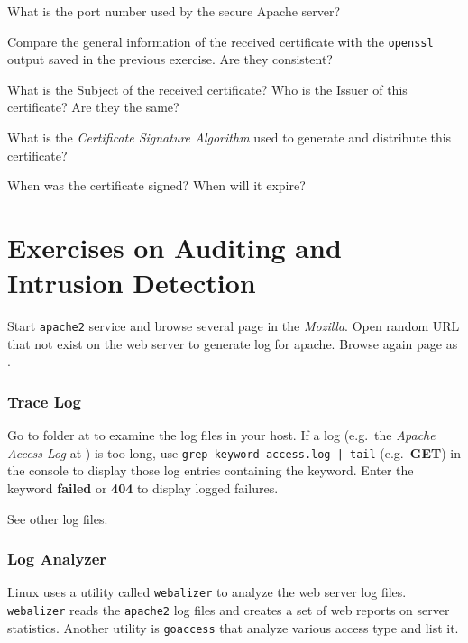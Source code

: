 \documentclass{../UTNetLab}
\begin{document}
    \begin{report}
        \item What is the port number used by the secure Apache server?
        
        \item Compare the general information of the received certificate with the \lstinline{openssl} output saved in the previous exercise.
            Are they consistent?
        
        \item What is the Subject of the received certificate? Who is the Issuer of this certificate? Are they the same?
        
        \item What is the \textit{Certificate Signature Algorithm} used to generate and distribute this certificate?
        
        \item When was the certificate signed? When will it expire?
    \end{report}

\part{Exercises on Auditing and Intrusion Detection}
    Start \lstinline{apache2} service and browse several page in the \textit{Mozilla}.
    Open random URL that not exist on the web server to generate log for apache.
    Browse again page as .

\section{Trace Log}
    Go to  folder at  to examine the log files in your host.
    If a log (e.g.\ the \textit{Apache Access Log} at ) is too long, use \lstinline[emph={keyword}]{grep keyword access.log | tail} (e.g.\ \textbf{GET}) in the {console} to display those log entries containing the keyword.
    Enter the keyword \textbf{failed} or \textbf{404} to display logged failures.

    See other log files.

\section{Log Analyzer}
    Linux uses a utility called \lstinline{webalizer} to analyze the web server log files.
    \lstinline{webalizer} reads the \lstinline{apache2} log files and creates a set of web reports on server statistics.
    Another utility is \lstinline{goaccess} that analyze various access type and list it.
\end{document}
